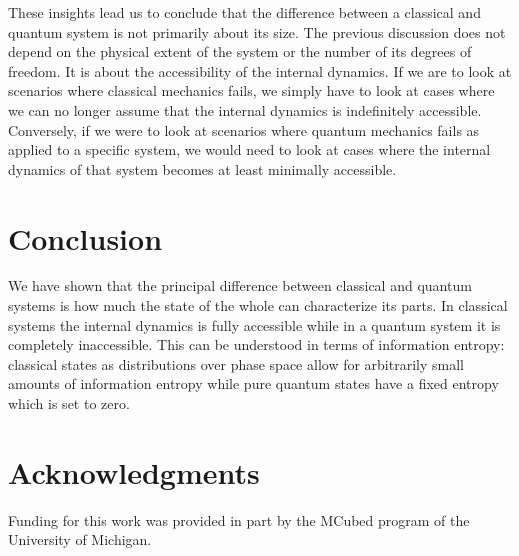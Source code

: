 \documentclass{ws-ijqi}
\begin{document}
These insights lead us to conclude that the difference between a classical and quantum system is not primarily about its size. The previous discussion does not depend on the physical extent of the system or the number of its degrees of freedom. It is about the accessibility of the internal dynamics. If we are to look at scenarios where classical mechanics fails, we simply have to look at cases where we can no longer assume that the internal dynamics is indefinitely accessible. Conversely, if we were to look at scenarios where quantum mechanics fails as applied to a specific system, we would need to look at cases where the internal dynamics of that system becomes at least minimally accessible.

\section{Conclusion}

We have shown that the principal difference between classical and quantum systems is how much the state of the whole can characterize its parts. In classical systems the internal dynamics is fully accessible while in a quantum system it is completely inaccessible. This can be understood in terms of information entropy: classical states as distributions over phase space allow for arbitrarily small amounts of information entropy while pure quantum states have a fixed entropy which is set to zero.

\section*{Acknowledgments}

Funding for this work was provided in part by the MCubed program of the University of Michigan.


\renewcommand\bibname{References}



\end{document}
